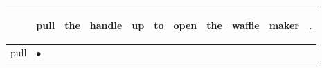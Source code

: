 \documentclass[landscape]{article}
\newcommand{\ssp}{\hspace{2pt}}
\newcommand{\mex}{\cellcolor{g}$\bullet$}
\begin{document}
\noindent\begin{tabular}{|l|p{10pt}|p{10pt}|p{10pt}|p{10pt}|p{10pt}|p{10pt}|p{10pt}|p{10pt}|p{10pt}|p{10pt}|}
\hline
&\begin{sideways}\cellcolor{ref0}pull\hspace{12pt}\end{sideways}&\begin{sideways}\cellcolor{ref1}the\hspace{12pt}\end{sideways}&\begin{sideways}\cellcolor{ref2}handle\hspace{12pt}\end{sideways}&\begin{sideways}\cellcolor{ref3}up\hspace{12pt}\end{sideways}&\begin{sideways}\cellcolor{ref4}to\hspace{12pt}\end{sideways}&\begin{sideways}\cellcolor{ref5}open\hspace{12pt}\end{sideways}&\begin{sideways}\cellcolor{ref6}the\hspace{12pt}\end{sideways}&\begin{sideways}\cellcolor{ref7}waffle\hspace{12pt}\end{sideways}&\begin{sideways}\cellcolor{ref8}maker\hspace{12pt}\end{sideways}&\begin{sideways}\cellcolor{ref9}.\hspace{12pt}\end{sideways}\\
\hline
\ssp \cellcolor{ref0}pull \ssp&\hspace{2pt}\mex&\hspace{2pt}&\hspace{2pt}&\hspace{2pt}&\hspace{2pt}&\hspace{2pt}&\hspace{2pt}&\hspace{2pt}&\hspace{2pt}&\hspace{2pt}\\

\end{tabular}
\end{document}

